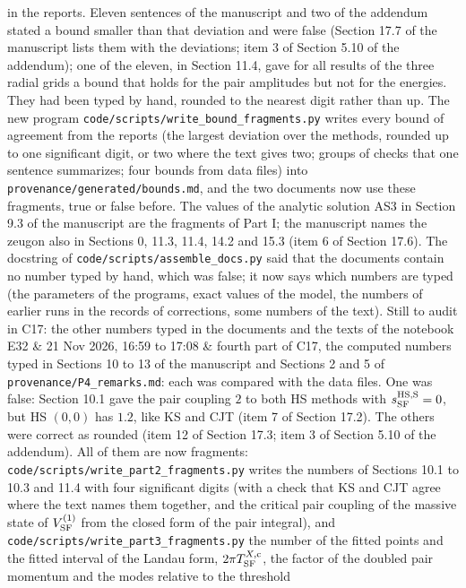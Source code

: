 \documentclass[
  10pt,
]{article}
\begin{document}
\begin{longtable}[]
in the reports. Eleven sentences of the manuscript and two of the
addendum stated a bound smaller than that deviation and were false
(Section 17.7 of the manuscript lists them with the deviations; item 3
of Section 5.10 of the addendum); one of the eleven, in Section 11.4,
gave for all results of the three radial grids a bound that holds for
the pair amplitudes but not for the energies. They had been typed by
hand, rounded to the nearest digit rather than up. The new program
\texttt{code/scripts/write\_bound\_fragments.py} writes every bound of
agreement from the reports (the largest deviation over the methods,
rounded up to one significant digit, or two where the text gives two;
groups of checks that one sentence summarizes; four bounds from data
files) into \texttt{provenance/generated/bounds.md}, and the two
documents now use these fragments, true or false before. The values of
the analytic solution AS3 in Section 9.3 of the manuscript are the
fragments of Part I; the manuscript names the zeugon also in Sections 0,
11.3, 11.4, 14.2 and 15.3 (item 6 of Section 17.6). The docstring of
\texttt{code/scripts/assemble\_docs.py} said that the documents contain
no number typed by hand, which was false; it now says which numbers are
typed (the parameters of the programs, exact values of the model, the
numbers of earlier runs in the records of corrections, some numbers of
the text). Still to audit in C17: the other numbers typed in the
documents and the texts of the notebook \\
E32 & 21 Nov 2026, 16:59 to 17:08 & fourth part of C17, the computed
numbers typed in Sections 10 to 13 of the manuscript and Sections 2 and
5 of \texttt{provenance/P4\_remarks.md}: each was compared with the data
files. One was false: Section 10.1 gave the pair coupling \(2\) to both
HS methods with \(s^{\rm HS,S}_{\rm SF}=0\), but HS \((0,0)\) has
\(1.2\), like KS and CJT (item 7 of Section 17.2). The others were
correct as rounded (item 12 of Section 17.3; item 3 of Section 5.10 of
the addendum). All of them are now fragments:
\texttt{code/scripts/write\_part2\_fragments.py} writes the numbers of
Sections 10.1 to 10.3 and 11.4 with four significant digits (with a
check that KS and CJT agree where the text names them together, and the
critical pair coupling of the massive state of \(V^{(1)}_{\rm SF}\) from
the closed form of the pair integral), and
\texttt{code/scripts/write\_part3\_fragments.py} the number of the
fitted points and the fitted interval of the Landau form,
\(2\pi T^{X,{\rm c}}_{\rm SF}\), the factor of the doubled pair momentum
and the modes relative to the threshold \\

\end{longtable}
\end{document}
